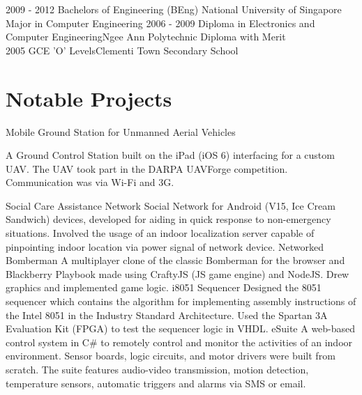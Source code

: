 \documentclass[]{friggeri-cv}
\begin{document}
\begin{entrylist}
	\entry
	{2009 - 2012}
	{Bachelors of Engineering (BEng)}
	{National University of Singapore}
	{
		Major in Computer Engineering
	}
	\entry
	{2006 - 2009}
	{Diploma in Electronics and Computer Engineering}{Ngee Ann Polytechnic}
	{
		Diploma with Merit\\
	}
	\entry
	{2005}
	{GCE 'O' Levels}{Clementi Town Secondary School}
	{}
\end{entrylist}
\pagebreak
\section{Notable Projects}
\begin{entrylist}
	{Mobile Ground Station for Unmanned Aerial Vehicles}
	{}
	{
		A Ground Control Station built on the iPad (iOS 6) interfacing for a custom UAV. The UAV took part in the DARPA UAVForge competition. Communication was via Wi-Fi and 3G.

	}
	{Social Care Assistance Network}
	{}
	{Social Network for Android (V15, Ice Cream Sandwich) devices, developed for aiding in quick response to non-emergency situations. Involved the usage of an indoor localization server capable of pinpointing indoor location via power signal of network device.}
	{Networked Bomberman}
	{}
	{A multiplayer clone of the classic Bomberman for the browser and Blackberry Playbook made using CraftyJS (JS game engine) and NodeJS. Drew graphics and implemented game logic. }
	{i8051 Sequencer}
	{}
	{Designed the 8051 sequencer which contains the algorithm for implementing assembly instructions of the Intel 8051 in the Industry Standard Architecture. Used the Spartan 3A Evaluation Kit (FPGA) to test the sequencer logic in VHDL.}
	{eSuite}
	{}
	{A web-based control system in C\# to remotely control and monitor the activities of an indoor environment. Sensor boards, logic circuits, and motor drivers were built from scratch. The suite features audio-video transmission, motion detection, temperature sensors, automatic triggers and alarms via SMS or email.}

\end{entrylist}
\end{document}
